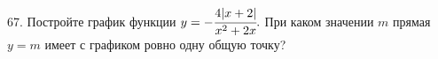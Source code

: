 67. Постройте график функции $y=-\cfrac{4|x+2|}{x^2+2x}.$ При каком значении $m$ прямая $y=m$ имеет с графиком ровно одну общую точку?\\
